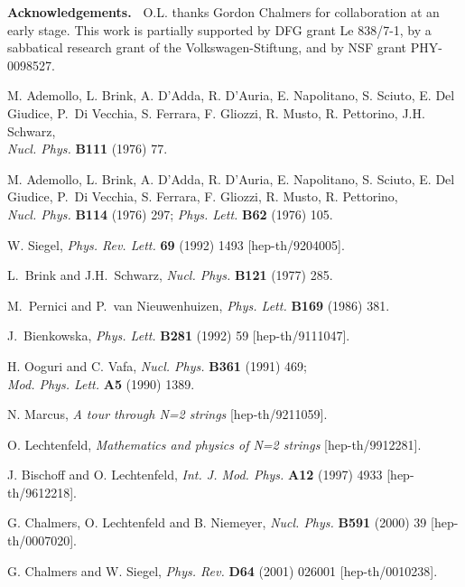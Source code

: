 \documentclass[a4paper,11pt]{article}
\begin{document}
\bigskip\noindent
{\bf Acknowledgements.\  }
O.L. thanks Gordon Chalmers for collaboration at an early stage.
This work is partially supported by DFG grant Le 838/7-1, by a sabbatical
research grant of the Volkswagen-Stiftung, and by NSF grant PHY-0098527.


\vfill\eject
\begin{thebibliography}{99}

M. Ademollo, L. Brink, A. D'Adda, R. D'Auria, E. Napolitano, S. Sciuto, 
E. Del Giudice, P.~Di Vecchia, S. Ferrara, F. Gliozzi, R. Musto, R. Pettorino, 
J.H. Schwarz,\\
{\sl Nucl. Phys.} {\bf B111} (1976) 77. 

M. Ademollo, L. Brink, A. D'Adda, R. D'Auria, E. Napolitano, S. Sciuto, 
E. Del Giudice, P.~Di Vecchia, S. Ferrara, F. Gliozzi, R. Musto, 
R. Pettorino,\\
{\sl Nucl. Phys.} {\bf B114} (1976) 297;
{\sl Phys. Lett.} {\bf B62} (1976) 105.

W. Siegel,
{\sl Phys. Rev. Lett.} {\bf 69} (1992) 1493 [hep-th/9204005].

L.~Brink and J.H.~Schwarz,
{\sl Nucl. Phys.} {\bf B121} (1977) 285.

M.~Pernici and P.~van Nieuwenhuizen,
{\sl Phys. Lett.} {\bf B169} (1986) 381.

J.~Bienkowska,
{\sl Phys. Lett.} {\bf B281} (1992) 59 
[hep-th/9111047].

H. Ooguri and C. Vafa,
{\sl Nucl. Phys.} {\bf B361} (1991) 469;\\
{\sl Mod. Phys. Lett.} {\bf A5} (1990) 1389.

N. Marcus,
{\it A tour through N=2 strings}
[hep-th/9211059].

O. Lechtenfeld,
{\it Mathematics and physics of N=2 strings}
[hep-th/9912281].

J. Bischoff and O. Lechtenfeld,
{\sl Int. J. Mod. Phys.} {\bf A12} (1997) 4933 
[hep-th/9612218].

G. Chalmers, O. Lechtenfeld and B. Niemeyer,
{\sl Nucl. Phys.} {\bf B591} (2000) 39 
[hep-th/0007020].

G. Chalmers and W. Siegel,
{\sl Phys. Rev.} {\bf D64} (2001) 026001 
[hep-th/0010238].


\end{thebibliography}
\end{document}
